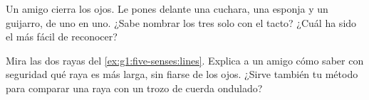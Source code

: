 \begin{exercise}[$\star$]\label{exo:g1:five-senses:8}
Un amigo cierra los ojos. Le pones delante una cuchara, una esponja y
un guijarro, de uno en uno. ¿Sabe nombrar los tres solo con el tacto?
¿Cuál ha sido el más fácil de reconocer?
\end{exercise}

\begin{exercise}[$\star\star$]\label{exo:g1:five-senses:9}
Mira las dos rayas del \cref{ex:g1:five-senses:lines}. Explica a un
amigo cómo saber con seguridad qué raya es más larga, sin fiarse de
los ojos. ¿Sirve también tu método para comparar una raya con un
trozo de cuerda ondulado?
\end{exercise}
